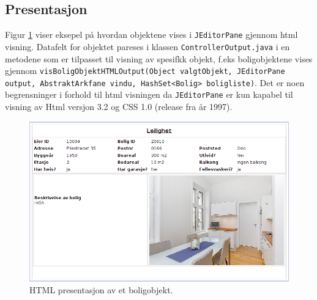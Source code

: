 \subsection{Presentasjon}
Figur \ref{fig:presentasjon} viser eksepel på hvordan objektene vises i \texttt{JEditorPane} gjennom html visning. Datafelt for objektet pareses i klassen \texttt{ControllerOutput.java} i en metodene som er tilpasset til visning av spesifkk objekt, f.eks boligobjektene vises gjennom \texttt{visBoligObjektHTMLOutput(Object valgtObjekt, JEditorPane output, AbstraktArkfane vindu, HashSet<Bolig> boligliste)}. Det er noen begrensninger i forhold til html visningen da \texttt{JEditorPane} er kun kapabel til visning av Html versjon 3.2 og CSS 1.0 (release fra år 1997). 

\begin{figure}[ht!]
 \includegraphics[width=\textwidth,height=\textheight,keepaspectratio]{./img/produktdokumentasjon/visuelle_detaljer/presentasjon.png}
 \caption{HTML presentasjon av et boligobjekt.}
 \label{fig:presentasjon}
\end{figure}


